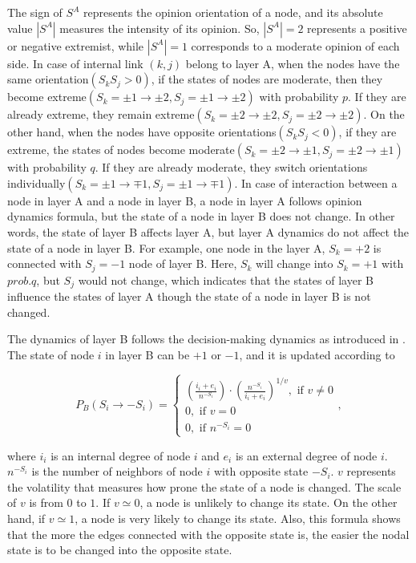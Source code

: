 The sign of $S^A$ represents the opinion orientation of a node, and its absolute value $|S^A|$ measures the intensity of its opinion. So, $|S^A|=2$ represents a positive or negative extremist, while  $|S^A|=1$ corresponds to a moderate opinion of each side. In case of internal link $(k, j)$ belong to layer A, when the nodes have the same orientation$(S_kS_j>0)$, if the states of nodes are moderate, then they become extreme$(S_k=\pm1 \rightarrow \pm2, S_j= \pm1 \rightarrow \pm2)$ with probability $p$. If they are already extreme, they remain extreme$(S_k=\pm2 \rightarrow \pm2, S_j= \pm2 \rightarrow \pm2)$. On the other hand, when the nodes have opposite orientations$(S_kS_j<0)$, if they are extreme, the states of nodes become moderate$(S_k=\pm2 \rightarrow \pm1, S_j= \pm2 \rightarrow \pm1)$ with probability $q$. If they are already moderate, they switch orientations individually$(S_k=\pm1 \rightarrow \mp1, S_j= \pm1 \rightarrow \mp1)$.  In case of interaction between a node in layer A and a node in layer B, a node in layer A follows opinion dynamics formula, but the state of a node in layer B does not change. In other words, the state of layer B affects layer A, but layer A dynamics do not affect the state of a node in layer B. For example, one node in the layer A, $S_k = +2$ is connected with  $S_j = -1$ node of layer B. Here, $S_k$ will change into $S_k = +1$ with $prob.q$, but $S_j$ would not change, which indicates that the states of layer B influence the states of layer A though the state of a node in layer B is not changed.

The dynamics of layer B follows the decision-making dynamics as introduced in \parencite{abrams2003, vazquez2010}. The state of node $i$ in layer B can be $+1$ or $-1$, and it is updated according to

\begin{equation}
{P_B}({S_i} \to  - {S_i}) = \begin{cases}
{\left({\displaystyle\frac{{{i_i} + {e_i}}}{{{n^{ - {S_i}}}}}}\right)}{\cdot}{\left({\displaystyle\frac{{n^{-{S_i}}}}{{{i_i} + {e_i}}}} \right)^{1/v}}  ,\mbox{ if } v \ne 0\\
0,\mbox{ if } v = 0\\
0,\mbox{ if } {n^{ - {S_i}}} = 0
\end{cases},
\end{equation}

where $i_i$ is an internal degree of node $i$ and $e_i$ is an external degree of node $i$. $n^{-S_i}$ is the number of neighbors of node $i$ with opposite state $-S_i$. $v$ represents the volatility that measures how prone the state of a node is changed. The scale of $v$ is from $0$ to $1$. If $v \simeq 0$,  a node is unlikely to change its state. On the other hand, if $v \simeq 1$, a node is very likely to change its state. Also, this formula shows that the more the edges connected with the opposite state is, the easier the nodal state is to be changed into the opposite state.

